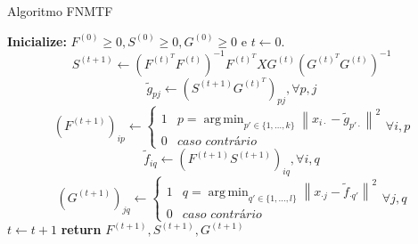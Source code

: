 \documentclass[
    12pt,                %
    oneside,            %
    a4paper,            %
    english,            %
    brazil                %
    ]{abntex2ppgsi}
\DeclareMathOperator*{\argmin}{arg\,min}
\newcommand{\norm}[1]{\left\lVert#1\right\rVert}
\begin{document}
\begin{algorithm}
\caption{Algoritmo FNMTF}
\label{algo:fnmtf}
    \begin{algorithmic}[1]
            \State \textbf{Inicialize:} $F^{(0)} \geq 0, S^{(0)} \geq 0, G^{(0)} \geq 0$ e $t \gets 0$.
                \State
                    \begin{equation}
                    \label{eq:fnmtf:updateS}
                        S^{(t+1)} \gets (F^{(t)^T} F^{(t)})^{-1} F^{(t)^T} X G^{(t)} (G^{(t)^T} G^{(t)})^{-1}
                    \end{equation}
                \State
                    \[
                        {\tilde g}_{pj} \gets (S^{(t+1)} G^{(t)^T})_{pj}, \forall p, j
                    \]
                \State
                    \begin{equation}
                    \label{eq:fnmtf:updateF}
                        (F^{(t+1)})_{ip} \gets \left\{
                            \begin{array}{ll}
                                1 & p = \argmin_{p' \in \{1, \dots, k\}} \norm{ x_{i \cdot} - {\tilde g}_{p' \cdot} }^2 \\
                                0 & \textit{caso contrário}
                            \end{array}
                        \right. \forall i, p
                    \end{equation}
                \State
                    \[
                        {\tilde f}_{iq} \gets (F^{(t+1)} S^{(t+1)})_{iq}, \forall i, q
                    \]
                \State
                    \begin{equation}
                    \label{eq:fnmtf:updateG}
                        (G^{(t+1)})_{jq} \gets \left\{
                            \begin{array}{ll}
                                1 & q = \argmin_{q' \in \{1, \dots, l\}} \norm{ x_{\cdot j} - {\tilde f}_{\cdot q'} }^2 \\
                                0 & \textit{caso contrário}
                            \end{array}
                        \right. \forall j, q
                    \end{equation}
                \State $t \gets t + 1$
            \EndWhile\label{euclidendwhile}
            \State \textbf{return} $F^{(t+1)}, S^{(t+1)}, G^{(t+1)}$
        \EndFunction
    \end{algorithmic}
\end{algorithm}
\end{document}
